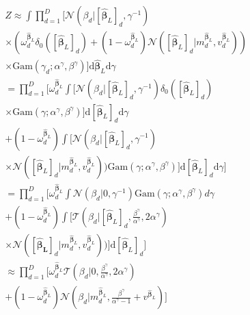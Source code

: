 \documentclass[letterpaper]{article}
\begin{document}
\begin{align}
&Z \approx \int \prod_{d=1}^{D} \big[\mathcal{N}(\beta_d | [\widehat{\boldsymbol\beta}_L]_d, \gamma^{-1}) \nonumber \\
&\times (\omega^{\widehat{\boldsymbol\beta}_L}_d \delta_0([\widehat{\boldsymbol\beta}_L]_d) + (1 - \omega^{\widehat{\boldsymbol\beta}_L}_d)\mathcal{N}([\widehat{\boldsymbol\beta}_L]_d | m^{\widehat{\boldsymbol\beta}_L}_d, v^{\widehat{\boldsymbol\beta}_L}_d)) \nonumber\\
&\times \text{Gam} (\gamma_d; \alpha^\gamma, \beta^\gamma)\big]\mathrm{d}\widehat{\boldsymbol\beta}_L \mathrm{d}\gamma  \nonumber\\
&= \prod_{d=1}^{D} \Big[\omega^{\widehat{\boldsymbol\beta}_L}_d \int \big[\mathcal{N}(\beta_d | [\widehat{\boldsymbol\beta}_L]_d, \gamma^{-1})  \delta_0([\widehat{\boldsymbol\beta}_L]_d) \nonumber \\
&\times \text{Gam} (\gamma; \alpha^\gamma, \beta^\gamma)\big]\mathrm{d}[\widehat{\boldsymbol\beta}_L]_d \mathrm{d}\gamma  \nonumber\\
& + (1 - \omega^{\widehat{\boldsymbol\beta}_L}_d)\int \big[\mathcal{N}(\beta_d | [\widehat{\boldsymbol\beta}_L]_d, \gamma^{-1})\nonumber\\
&\times \mathcal{N}([\widehat{\boldsymbol\beta}_L]_d | m^{\widehat{\boldsymbol\beta}_L}_d, v^{\widehat{\boldsymbol\beta}_L}_d)) \text{Gam} (\gamma; \alpha^\gamma, \beta^\gamma)\big]\mathrm{d}[\widehat{\boldsymbol\beta}_L]_d \mathrm{d}\gamma\Big]  \nonumber\\
& = \prod_{d=1}^{D} \Big[\omega^{\widehat{\boldsymbol\beta}_L}_d \int \mathcal{N}(\beta_d | 0, \gamma^{-1})  \text{Gam} (\gamma; \alpha^\gamma, \beta^\gamma) d\gamma  \nonumber\\
& + (1 - \omega^{\widehat{\boldsymbol\beta}_L}_d)\int \big[\mathcal{T}(\beta_d | [\widehat{\boldsymbol\beta}_L]_d, \frac{\beta^\gamma}{\alpha^\gamma}, 2\alpha^\gamma)  \nonumber\\
&\times \mathcal{N}([\mathbf{\widehat{\boldsymbol\beta}_L}]_d| m^{\widehat{\boldsymbol\beta}_L}_d, v^{\widehat{\boldsymbol\beta}_L}_d))\big] \mathrm{d}[\widehat{\boldsymbol\beta}_L]_d\Big]  \nonumber\\
& \approx \prod_{d=1}^D \Big[\omega^{\widehat{\boldsymbol\beta}_L}_d  \mathcal{T}(\beta_d | 0, \frac{\beta^\gamma}{\alpha^\gamma}, 2\alpha^\gamma) \nonumber \\
\label{eq:Z_approx}
&+ (1 - \omega^{\widehat{\boldsymbol\beta}_L}_d)\mathcal{N}(\beta_d | m^{\widehat{\boldsymbol\beta}_L}_d, \frac{\beta^\gamma}{\alpha^\gamma - 1} + v^{\widehat{\boldsymbol\beta}_L})\Big]
\end{align}
\end{document}
